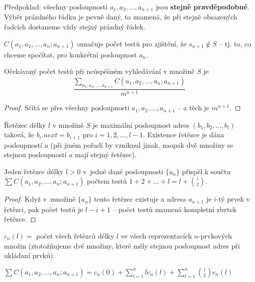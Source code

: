 \documentclass[a4paper,12pt]{article}
\begin{document}
Předpoklad: všechny posloupnosti $a_1,a_2,\dots,a_{n+1}$ jsou 
{\bf stejně pravděpodobné}. Výběr prázdného řádku je 
pevně daný, to znamená, že při stejně obsazených 
řadcích dostaneme vždy stejný prázdný řádek.


\begin{definice} 
    $C(a_1,a_2,\dots,a_n;a_{n+1})$ označuje počet 
testů pro zjiš\-tění, že $s_{n+1}\notin S$ -- tj. to, co chceme spočítat, pro konkrétní posloupnost $a_n$.
\end{definice}

\begin{lemma}
    Očekávaný počet testů při 
    neúspěšném vy\-hledávání v množině $S$ je 
    $$\frac {\sum_{a_1,a_2,\dots
    ,a_{n+1}} C(a_1,a_2,\dots,a_n;a_{n+1})}{m^{n+1}}$$   
\end{lemma}

\begin{proof}
    Sčítá se přes všechny posloupnosti $a_1,a_2,\dots
    ,a_{n+1}$ -- 
    a těch je $m^{n+1}$.
\end{proof}

\begin{definice}
Řetězec délky $l$ v množině $S$ je maximální posloupnost 
adres $(b_1,b_2,\dots,b_l)$ taková, že $b_i.next=b_{i+1}$ pro 
$i=1,2,\dots,l-1$. Existence řetězce je dána posloupností $a$ (při jiném pořadí by vzniknul jinak, naopak dvě množiny se stejnou posloupností $a$ mají stejný řetězec).
\end{definice}

\begin{lemma}
    Jeden řetězec délky $l>0$ v~jedné dané posloupnosti $\{a_n\}$ přispěl k součtu 
    $\sum C(a_1,a_2,\dots,a_n;a_{n+1})$ počtem testů $1+2+\dots+l=l+\binom l2$.
\end{lemma}

\begin{proof}
Když v~množině $\{a_n\}$ tento řetězec existuje a adresa $a_{n+1}$ je $i$-tý prvek v řetězci, pak počet 
testů je $l-i+1$ -- počet testů znamená  kompletní zbytek řetězce.
\end{proof}


\begin{definice}
$c_n(l)=$ počet všech řetězců délky $
l$ ve všech 
reprezentacích $n$-prvkových množin (ztotožňuje\-me dvě 
množiny, které měly stej\-nou posloupnost adres při 
ukládaní prvků).
\end{definice}

\begin{lemma}
    $\sum C(a_1,a_2,\dots,a_n;a_{n+1})=c_n(0)+\sum_{l=1}^nlc_n(l)+\sum_{l=1}^n\binom l2c_n(l)$
\end{lemma}
\end{document}
